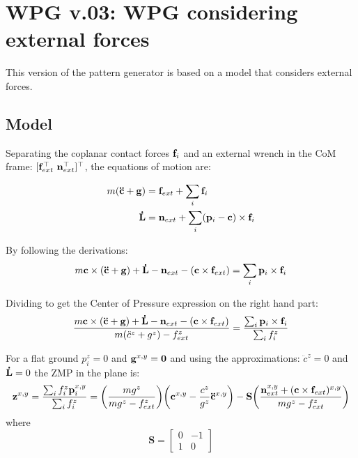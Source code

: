 

\chapter{WPG v.03: WPG considering external forces}


This version of the pattern generator is based on a model that considers external forces.
\section{Model}
Separating the coplanar contact forces $\mathbf{f}_i$ and an external wrench in the CoM frame:
$[\mathbf{f}_{ext}^\top ~ \mathbf{n}_{ext}^\top]^\top$, the equations of motion are:

\begin{align}
 m(\mathbf{\ddot{c}} + \mathbf{g}) &= \mathbf{f}_{ext} + \sum_i \mathbf{f}_i  \\
 \mathbf{\dot{L}} &= \mathbf{n}_{ext} + \sum_i (\mathbf{p}_i - \mathbf{c}) \times \mathbf{f}_i
\end{align}

By following the derivations:
\begin{equation}
 m \mathbf{c} \times (\mathbf{\ddot{c}} + \mathbf{g}) + \mathbf{\dot{L}} - \mathbf{n}_{ext} - (\mathbf{c} \times \mathbf{f}_{ext})
 =
 \sum_i \mathbf{p}_i \times \mathbf{f}_i
\end{equation}

Dividing to get the Center of Pressure expression on the right hand part:
\begin{equation}
 \frac{m \mathbf{c} \times (\mathbf{\ddot{c}} + \mathbf{g}) + \mathbf{\dot{L}} - \mathbf{n}_{ext} - (\mathbf{c} \times \mathbf{f}_{ext}) }
 {m(\ddot{c}^z + g^z) - f_{ext}^z}
 =
 \frac{\sum_i \mathbf{p}_i \times \mathbf{f}_i}
 {\sum_i f_i^z}
\end{equation}

For a flat ground $p_i^z = 0$ and $\mathbf{g}^{x,y} = \mathbf{0}$ and using the approximations: $\ddot{c}^z = 0$ and $\mathbf{\dot{L}} = 0$ the ZMP in the
plane is:
\begin{equation}
 \zmp^{x,y}
 =
 \frac{\sum_i f^z_i \pCoplanar^{x,y}}{\sum_i f_i^z}
 =
 \left( \frac{m g^z}{m g^z - f^z_{ext}} \right)
 \left( \comP^{x,y} - \frac{c^z}{g^z} \comA^{x,y} \right)
 -
 \mathbf{S}
 \left( \frac{\tExt^{x,y} + (\comP \times \fExt)^{x,y} }{mg^z - f^z_{ext}} \right)
\end{equation}
where
\begin{equation}
 \mathbf{S} =
 \begin{bmatrix}
  0 & -1 \\
  1 & 0
 \end{bmatrix}
\end{equation}

